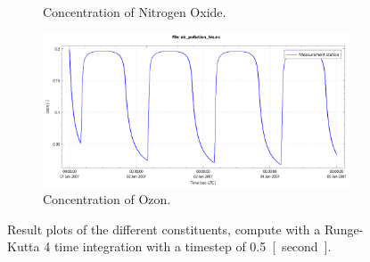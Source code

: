 \documentclass[biblatex]{mooiman_memo}
\begin{document}
\begin{figure}[H]
\begin{subfigure}{0.5\textwidth}
        \caption{Concentration of Nitrogen Oxide.}
    \end{subfigure}
    \begin{subfigure}{0.5\textwidth}
        \includegraphics[width=\textwidth]{figures/ozon_dt0d5.pdf}
        \caption{Concentration of Ozon.}
    \end{subfigure}
    \caption{Result plots of the different constituents, compute with a Runge-Kutta 4 time integration with a timestep of \SI{0.5}{[second]}.}
\end{figure}

\end{document}
